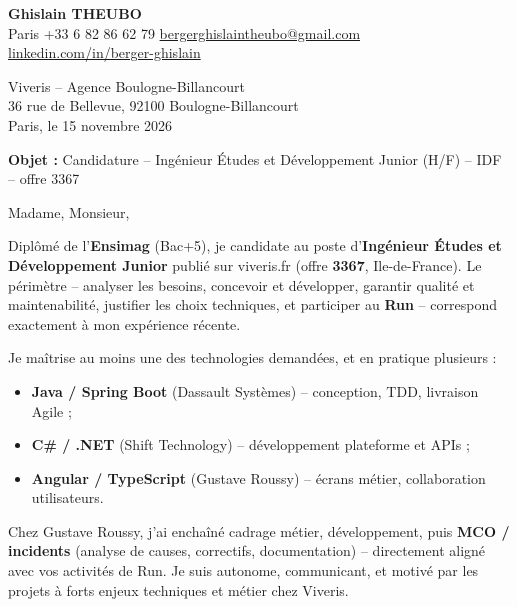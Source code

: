 \documentclass[11pt,a4paper]{article}
\begin{document}

\noindent\textbf{Ghislain THEUBO}\\
Paris \quad +33 6 82 86 62 79 \quad \href{mailto:bergerghislaintheubo@gmail.com}{bergerghislaintheubo@gmail.com}\\
\href{https://www.linkedin.com/in/berger-ghislain}{linkedin.com/in/berger-ghislain}

\vspace{0.5em}
\begin{flushright}
Viveris -- Agence Boulogne-Billancourt\\
36 rue de Bellevue, 92100 Boulogne-Billancourt\\
Paris, le 15 novembre 2026
\end{flushright}

\vspace{0.35em}
\noindent\textbf{Objet :} Candidature -- Ing\'enieur \'Etudes et D\'eveloppement Junior (H/F) -- IDF -- offre 3367

\vspace{0.7em}
\noindent Madame, Monsieur,

\vspace{0.4em}
\noindent Dipl\^om\'e de l'\textbf{Ensimag} (Bac+5), je candidate au poste d'\textbf{Ing\'enieur \'Etudes et D\'eveloppement Junior} publi\'e sur viveris.fr (offre \textbf{3367}, Ile-de-France). Le p\'erim\`etre -- analyser les besoins, concevoir et d\'evelopper, garantir qualit\'e et maintenabilit\'e, justifier les choix techniques, et participer au \textbf{Run} -- correspond exactement \`a mon exp\'erience r\'ecente.

\vspace{0.35em}
\noindent Je ma\^itrise au moins une des technologies demand\'ees, et en pratique plusieurs :
\begin{itemize}\itemsep0.12em
  \item \textbf{Java / Spring Boot} (Dassault Syst\`emes) -- conception, TDD, livraison Agile ;
  \item \textbf{C\# / .NET} (Shift Technology) -- d\'eveloppement plateforme et APIs ;
  \item \textbf{Angular / TypeScript} (Gustave Roussy) -- \'ecrans m\'etier, collaboration utilisateurs.
\end{itemize}

\noindent Chez Gustave Roussy, j'ai encha\^in\'e cadrage m\'etier, d\'eveloppement, puis \textbf{MCO / incidents} (analyse de causes, correctifs, documentation) -- directement align\'e avec vos activit\'es de Run. Je suis autonome, communicant, et motiv\'e par les projets \`a forts enjeux techniques et m\'etier chez Viveris.
\end{document}
